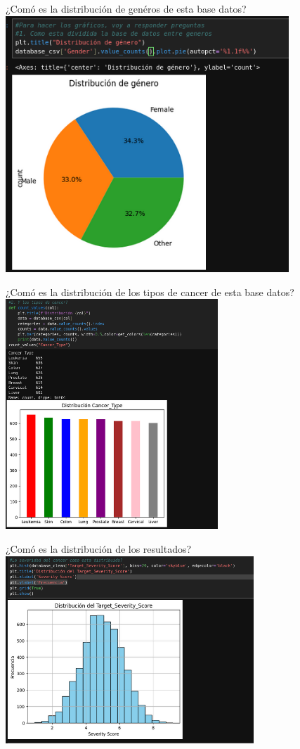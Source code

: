 \documentclass{beamer}
\begin{document}
    \begin{frame}[fragile]{¿Comó es la distribución de genéros de esta base datos?}
        \center
    \includegraphics[width=0.8\textwidth]{../figures/img1.png}
    \end{frame}
    \begin{frame}[fragile]{¿Comó es la distribución de los tipos de cancer de esta base datos?}
        \center
    \includegraphics[width=0.6\textwidth]{../figures/img2.png}
    \end{frame}
    \begin{frame}[fragile]{¿Comó es la distribución de los resultados?}
    \center
    \includegraphics[width=0.7\textwidth]{../figures/img3.png}
    \end{frame}
\end{document}
